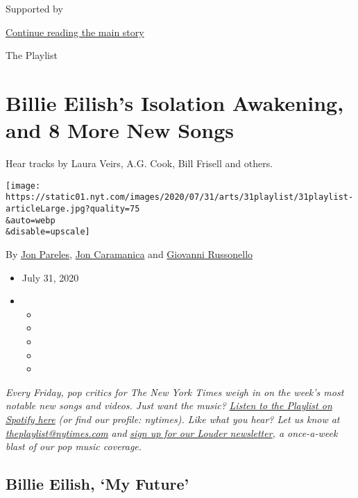 Supported by

\protect\hyperlink{after-sponsor}{Continue reading the main story}

The Playlist

\hypertarget{billie-eilishs-isolation-awakening-and-8-more-new-songs}{%
\section{Billie Eilish's Isolation Awakening, and 8 More New
Songs}\label{billie-eilishs-isolation-awakening-and-8-more-new-songs}}

Hear tracks by Laura Veirs, A.G. Cook, Bill Frisell and others.

\texttt{[image: https://static01.nyt.com/images/2020/07/31/arts/31playlist/31playlist-articleLarge.jpg?quality=75\\\&auto=webp\\\&disable=upscale]}

By \href{https://www.nytimes.com/by/jon-pareles}{Jon Pareles},
\href{https://www.nytimes.com/by/jon-caramanica}{Jon Caramanica} and
\href{https://www.nytimes.com/by/giovanni-russonello}{Giovanni
Russonello}

\begin{itemize}
\item
  July 31, 2020
\item
  \begin{itemize}
  \item
  \item
  \item
  \item
  \item
  \end{itemize}
\end{itemize}

\emph{Every Friday, pop critics for The New York Times weigh in on the
week's most notable new songs and videos. Just want the music?}
\href{https://open.spotify.com/playlist/5S3JLpPLj9BsLFyaVHf8Nf?si=h85ZkCLVT7e_XvKKNuBdPQ}{\emph{Listen
to the Playlist on Spotify here}} \emph{(or find our profile: nytimes).
Like what you hear? Let us know at}
\href{mailto:theplaylist@nytimes.com}{\emph{theplaylist@nytimes.com}}
\emph{and}
\href{https://www.nytimes.com/newsletters/louder?module=inline}{\emph{sign
up for our Louder newsletter}}\emph{, a once-a-week blast of our pop
music coverage.}

\hypertarget{billie-eilish-my-future}{%
\subsection{Billie Eilish, `My Future'}\label{billie-eilish-my-future}}

